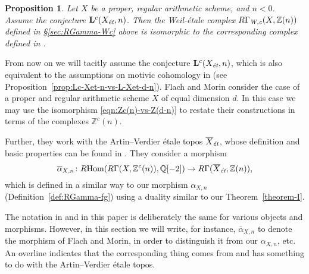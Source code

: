 \documentclass[leqno,12pt]{article}
\theoremstyle{plain}
\newtheorem{proposition}[theorem]{\indent\sc Proposition}
\theoremstyle{definition}
\DeclareMathOperator{\Hom}{Hom}
\newcommand{\QQ}{\mathbb{Q}}
\newcommand{\ZZ}{\mathbb{Z}}
\newcommand{\Wc}{\text{\it W,c}}
\newcommand{\et}{\text{\it \'{e}t}}
\newcommand{\RHom}{R\!\Hom}
\begin{document}
\begin{proposition}
  \label{prop:comparison-with-FM}
  Let $X$ be a proper, regular arithmetic scheme, and $n < 0$. Assume the
  conjecture $\mathbf{L}^c (X_\et, n)$. Then the Weil-\'{e}tale complex
  $R\Gamma_\Wc (X, \ZZ(n))$ defined in {\rm \S\ref{sec:RGamma-Wc}} above is isomorphic
  to the corresponding complex defined in {\rm \cite{Flach-Morin-2018}}.
\end{proposition}

From now on we will tacitly assume the conjecture $\mathbf{L}^c (X_\et, n)$,
which is also equivalent to the assumptions on motivic cohomology in
\cite{Flach-Morin-2018} (see
Proposition~\ref{prop:Lc-Xet-n-vs-L-Xet-d-n}). Flach and Morin consider the case
of a proper and regular arithmetic scheme $X$ of equal dimension $d$. In this
case we may use the isomorphism \eqref{eqn:Zc(n)-vs-Z(d-n)} to restate their
constructions in terms of the complexes $\ZZ^c (n)$.

Further, they work with the Artin--Verdier \'{e}tale topos $\overline{X}_\et$,
whose definition and basic properties can be found in \cite[\S
6]{Flach-Morin-2018}.  They consider a morphism
\[ \overline{\alpha}_{X,n}\colon \RHom (R\Gamma (X, \ZZ^c (n)), \QQ [-2]) \to
  R\Gamma (\overline{X}_\et, \ZZ (n)), \]
which is defined in a similar way to our morphism $\alpha_{X,n}$
(Definition~\ref{def:RGamma-fg}) using a duality similar to our
Theorem~\ref{theorem-I}.

The notation in \cite{Flach-Morin-2018} and in this paper is deliberately the
same for various objects and morphisms. However, in this section we will write,
for instance, $\overline{\alpha}_{X,n}$ to denote the morphism of Flach and
Morin, in order to distinguish it from our $\alpha_{X,n}$, etc. An overline
indicates that the corresponding thing comes from \cite{Flach-Morin-2018} and has something to do with the Artin--Verdier \'{e}tale topos.
\end{document}
